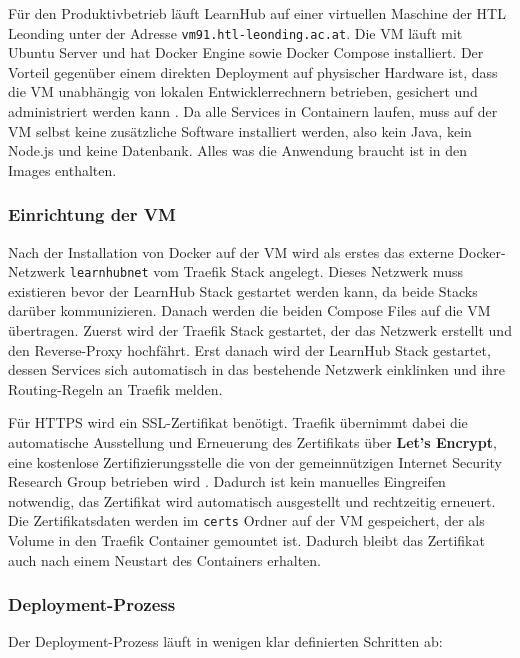 \label{sec:vm-deployment}

Für den Produktivbetrieb läuft LearnHub auf einer virtuellen Maschine 
der HTL Leonding unter der Adresse \texttt{vm91.htl-leonding.ac.at}. 
Die VM läuft mit Ubuntu Server und hat Docker Engine sowie Docker 
Compose installiert. Der Vorteil gegenüber einem direkten Deployment 
auf physischer Hardware ist, dass die VM unabhängig von lokalen 
Entwicklerrechnern betrieben, gesichert und administriert werden 
kann \cite{pahl2015containerization}. Da alle Services in Containern 
laufen, muss auf der VM selbst keine zusätzliche Software installiert 
werden, also kein Java, kein Node.js und keine Datenbank. Alles was 
die Anwendung braucht ist in den Images enthalten.

\subsubsection{Einrichtung der VM}

Nach der Installation von Docker auf der VM wird als erstes das 
externe Docker-Netzwerk \texttt{learnhubnet} vom Traefik Stack 
angelegt. Dieses Netzwerk muss existieren bevor der LearnHub Stack 
gestartet werden kann, da beide Stacks darüber kommunizieren. 
Danach werden die beiden Compose Files auf die VM übertragen. 
Zuerst wird der Traefik Stack gestartet, der das Netzwerk erstellt 
und den Reverse-Proxy hochfährt. Erst danach wird der LearnHub 
Stack gestartet, dessen Services sich automatisch in das bestehende 
Netzwerk einklinken und ihre Routing-Regeln an Traefik melden.

Für HTTPS wird ein SSL-Zertifikat benötigt. Traefik übernimmt 
dabei die automatische Ausstellung und Erneuerung des Zertifikats 
über \textbf{Let's Encrypt}, eine kostenlose Zertifizierungsstelle 
die von der gemeinnützigen Internet Security Research Group 
betrieben wird \cite{letsencrypt}. Dadurch ist kein manuelles 
Eingreifen notwendig, das Zertifikat wird automatisch ausgestellt 
und rechtzeitig erneuert. Die Zertifikatsdaten werden im 
\texttt{certs} Ordner auf der VM gespeichert, der als Volume 
in den Traefik Container gemountet ist. Dadurch bleibt das 
Zertifikat auch nach einem Neustart des Containers erhalten.

\subsubsection{Deployment-Prozess}

Der Deployment-Prozess läuft in wenigen klar definierten Schritten ab:

